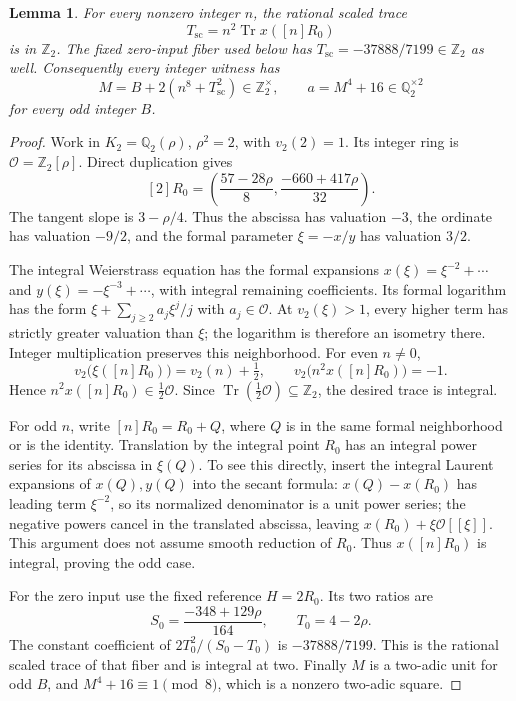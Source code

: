 \documentclass[11pt,a4paper]{article}
\newtheorem{lemma}[theorem]{Lemma}
\newcommand{\Q}{\mathbb Q}\newcommand{\Z}{\mathbb Z}
\DeclareMathOperator{\Tr}{Tr}\DeclareMathOperator{\Nm}{Nm}
\begin{document}
\begin{lemma}\label{lem:trace-two}
For every nonzero integer $n$, the rational scaled trace
\[
                 T_{\mathrm{sc}}=n^2\Tr x([n]R_0)
\]
is in $\Z_2$. The fixed zero-input fiber used below has
$T_{\mathrm{sc}}=-37888/7199\in\Z_2$ as well.
Consequently every integer witness has
\[
 M=B+2(n^8+T_{\mathrm{sc}}^2)\in\Z_2^\times,
 \qquad a=M^4+16\in\Q_2^{\times2}
\]
for every odd integer $B$.
\end{lemma}
\begin{proof}
Work in $K_2=\Q_2(\rho)$, $\rho^2=2$, with $v_2(2)=1$.
Its integer ring is $\mathcal O=\Z_2[\rho]$. Direct duplication gives
\[
 [2]R_0=\left(\frac{57-28\rho}{8},
             \frac{-660+417\rho}{32}\right).
\]
The tangent slope is $3-\rho/4$. Thus the abscissa has valuation $-3$,
the ordinate has valuation $-9/2$, and the formal parameter
$\xi=-x/y$ has valuation $3/2$.

The integral Weierstrass equation has the formal expansions
$x(\xi)=\xi^{-2}+\cdots$ and $y(\xi)=-\xi^{-3}+\cdots$, with integral
remaining coefficients. Its formal logarithm has the form
$\xi+\sum_{j\ge2}a_j\xi^j/j$ with $a_j\in\mathcal O$.
At $v_2(\xi)>1$, every higher term has strictly greater valuation than
$\xi$; the logarithm is therefore an isometry there. Integer
multiplication preserves this neighborhood. For even $n\ne0$,
\[
 v_2\bigl(\xi([n]R_0)\bigr)=v_2(n)+\tfrac12,
 \qquad v_2\bigl(n^2x([n]R_0)\bigr)=-1.
\]
Hence $n^2x([n]R_0)\in\tfrac12\mathcal O$. Since
$\Tr(\tfrac12\mathcal O)\subseteq\Z_2$, the desired trace is integral.

For odd $n$, write $[n]R_0=R_0+Q$, where $Q$ is in the same formal
neighborhood or is the identity. Translation by the integral point
$R_0$ has an integral power series for its abscissa in $\xi(Q)$.
To see this directly, insert the integral Laurent expansions of
$x(Q),y(Q)$ into the secant formula: $x(Q)-x(R_0)$ has leading term
$\xi^{-2}$, so its normalized denominator is a unit power series;
the negative powers cancel in the translated abscissa, leaving
$x(R_0)+\xi\mathcal O[[\xi]]$. This argument does not assume smooth
reduction of $R_0$. Thus $x([n]R_0)$ is integral, proving the odd case.

For the zero input use the fixed reference $H=2R_0$. Its two ratios are
\[
 S_0=\frac{-348+129\rho}{164},\qquad T_0=4-2\rho.
\]
The constant coefficient of $2T_0^2/(S_0-T_0)$ is
$-37888/7199$. This is the rational scaled trace of that fiber and is
integral at two. Finally $M$ is a two-adic unit for odd $B$, and
$M^4+16\equiv1\pmod8$, which is a nonzero two-adic square.
\end{proof}
\end{document}
